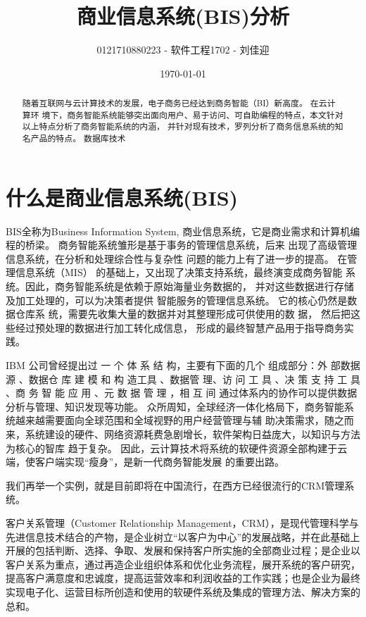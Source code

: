 \documentclass[lang=cn,11pt,numbers]{elegantpaper}
\title{商业信息系统(BIS)分析}
\author{0121710880223 - 软件工程1702 - 刘佳迎}
\date{\today}
\newcommand{\upcite}[1]{\textsuperscript{\textsuperscript{\cite{#1}}}}
\begin{document}
\maketitle

\begin {abstract} 

随着互联网与云计算技术的发展，电子商务已经达到商务智能（BI）新高度。 在云计算环
境下，商务智能系统能够突出面向用户、易于访问、可自助编程的特点，本文针对以上特点分析了商务智能系统的内涵，
并针对现有技术，罗列分析了商务信息系统的知名产品的特点。
\keywords 
{ 数据库技术 \quad}
\end{abstract}


\section{什么是商业信息系统(BIS)}

BIS全称为Business Information System, 商业信息系统，它是商业需求和计算机编程的桥梁。
商务智能系统雏形是基于事务的管理信息系统，后来
出现了高级管理信息系统，在分析和处理综合性与复杂性
问题的能力上有了进一步的提高。 在管理信息系统（MIS）
的基础上，又出现了决策支持系统，最终演变成商务智能
系统。因此，商务智能系统是依赖于原始海量业务数据的，
并对这些数据进行存储及加工处理的，可以为决策者提供
智能服务的管理信息系统。 它的核心仍然是数据仓库系
统，需要先收集大量的数据并对其整理形成可供使用的数
据， 然后把这些经过预处理的数据进行加工转化成信息，
形成的最终智慧产品用于指导商务实践\upcite{one}。 

IBM 公司曾经提出过 一 个 体 系 结 构\upcite{two}，主要有下面的几个 组成部分：外
部数据源 、数据仓 库 建 模 和 构 造工具 、数据管 理、访 问 工
具 、决 策 支 持 工 具 、商 务 智 能 应 用 、元 数 据 管 理 ，相 互 间
通过体系内的协作可以提供数据分析与管理、知识发现等功能。
众所周知，全球经济一体化格局下，商务智能系统越来越需要面向全球范围和全域视野的用户经营管理与辅
助决策需求，随之而来，系统建设的硬件、网络资源耗费急剧增长，软件架构日益庞大，以知识与方法为核心的智库
趋于复杂。 因此，云计算技术将系统的软硬件资源全部构建于云端，使客户端实现“瘦身”，是新一代商务智能发展
的重要出路。





我们再举一个实例，就是目前即将在中国流行，在西方已经很流行的CRM管理系统。

客户关系管理（Customer Relationship Management，CRM），是现代管理科学与先进信息技术结合的产物，是企业树立“以客户为中心”的发展战略，并在此基础上开展的包括判断、选择、争取、发展和保持客户所实施的全部商业过程；是企业以客户关系为重点，通过再造企业组织体系和优化业务流程，展开系统的客户研究，提高客户满意度和忠诚度，提高运营效率和利润收益的工作实践；也是企业为最终实现电子化、运营目标所创造和使用的软硬件系统及集成的管理方法、解决方案的总和。
\end{document}
